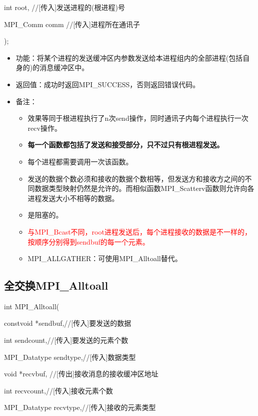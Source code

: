 \documentclass[UTF8]{article}%
\begin{document}
    \qquad int root, //[传入]发送进程的(根进程)号
    
    \qquad MPI\_Comm comm //[传入]进程所在通讯子
    
);

\begin{itemize}
    \item 功能：将某个进程的发送缓冲区内参数发送给本进程组内的全部进程(包括自身的)的消息缓冲区中。
    \item 返回值：成功时返回MPI\_SUCCESS，否则返回错误代码。
    \item 备注：
    
    {
        \begin{itemize}
            \item 效果等同于根进程执行了n次send操作，同时通讯子内每个进程执行一次recv操作。
            \item \textbf{每一个函数都包括了发送和接受部分，只不过只有根进程发送。}
            \item 每个进程都需要调用一次该函数。
            \item 发送的数据个数必须和接收的数据个数相等，但发送方和接收方之间的不同数据类型映射仍然是允许的。而相似函数MPI\_Scatterv函数则允许向各进程发送大小不相等的数据。
            \item 是阻塞的。
            \item \textcolor{red}{与MPI\_Bcast不同，root进程发送后，每个进程接收的数据是不一样的，按顺序分别得到sendbuf的每一个元素。}
            \item MPI\_ALLGATHER：可使用MPI\_Alltoall替代。
        \end{itemize}
    }

\end{itemize}

\subsection{全交换MPI\_Alltoall}

int MPI\_Alltoall(
    
    \qquad constvoid *sendbuf,//[传入]要发送的数据
    
    \qquad int sendcount,//[传入]要发送的元素个数
    
    \qquad MPI\_Datatype sendtype,//[传入]数据类型

    \qquad void *recvbuf, //[传出]接收消息的接收缓冲区地址

    \qquad int recvcount,//[传入]接收元素个数

    \qquad MPI\_Datatype recvtype,//[传入]接收的元素类型
\end{document}
